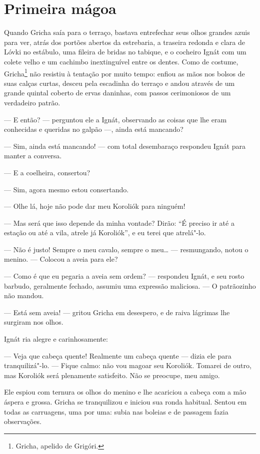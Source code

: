 \chapter{Primeira mágoa}

Quando Gricha saía para o terraço, bastava entrefechar seus olhos
grandes azuis para ver, atrás dos portões abertos da estrebaria, a
traseira redonda e clara de Lóvki no estábulo, uma fileira de bridas no
tabique, e o cocheiro Ignát com um colete velho e um cachimbo
inextinguível entre os dentes. Como de costume, Gricha\footnote{Gricha, apelido de Grigóri.} não resistiu à
tentação por muito tempo: enfiou as mãos nos bolsos de suas calças
curtas, desceu pela escadinha do terraço e andou através de um grande
quintal coberto de ervas daninhas, com passos cerimoniosos de um
verdadeiro patrão.

--- E então? --- perguntou ele a Ignát, observando as coisas que lhe
eram conhecidas e queridas no galpão ---, ainda está mancando?

--- Sim, ainda está mancando! --- com total desembaraço respondeu Ignát
para manter a conversa.

--- E a coelheira, consertou?

--- Sim, agora mesmo estou consertando.

--- Olhe lá, hoje não pode dar meu Koroliók para ninguém!

--- Mas será que isso depende da minha vontade? Dirão: ``É preciso ir
até a estação ou até a vila, atrele já Koroliók'', e eu terei que
atrelá"-lo.

--- Não é justo! Sempre o meu cavalo, sempre o meu\ldots{} --- resmungando,
notou o menino. --- Colocou a aveia para ele?

--- Como é que eu pegaria a aveia sem ordem? --- respondeu Ignát, e seu
rosto barbudo, geralmente fechado, assumiu uma expressão maliciosa. ---
O patrãozinho não mandou.

--- Está sem aveia! --- gritou Gricha em desespero, e de raiva lágrimas
lhe surgiram nos olhos.

Ignát ria alegre e carinhosamente:

--- Veja que cabeça quente! Realmente um cabeça quente --- dizia ele
para tranquilizá"-lo. --- Fique calmo: não vou magoar seu Koroliók.
Tomarei de outro, mas Koroliók será plenamente satisfeito. Não se
preocupe, meu amigo.

Ele espiou com ternura os olhos do menino e lhe acariciou a cabeça com a
mão áspera e grossa. Gricha se tranquilizou e iniciou sua ronda
habitual. Sentou em todas as carruagens, uma por uma: subia nas boleias
e de passagem fazia observações.

